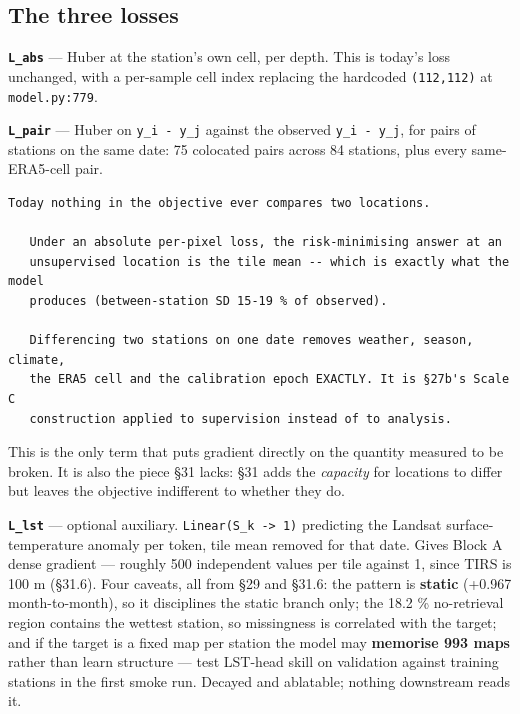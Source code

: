 \documentclass[10pt,a4paper]{article}
\begin{document}
\subsection*{The three losses}

\textbf{\texttt{L\_abs}} — Huber at the station's own cell, per depth. This is today's loss
unchanged, with a per-sample cell index replacing the hardcoded \texttt{(112,112)} at
\texttt{model.py:779}.

\textbf{\texttt{L\_pair}} — Huber on \texttt{y\_i - y\_j} against the observed \texttt{y\_i - y\_j}, for pairs
of stations on the same date: 75 colocated pairs across 84 stations, plus every
same-ERA5-cell pair.

\begin{Verbatim}[fontsize=\scriptsize,frame=leftline,framerule=0.6pt,rulecolor=\color{rulegray},xleftmargin=6pt,framesep=6pt,]
   Today nothing in the objective ever compares two locations.

   Under an absolute per-pixel loss, the risk-minimising answer at an
   unsupervised location is the tile mean -- which is exactly what the model
   produces (between-station SD 15-19 % of observed).

   Differencing two stations on one date removes weather, season, climate,
   the ERA5 cell and the calibration epoch EXACTLY. It is §27b's Scale C
   construction applied to supervision instead of to analysis.
\end{Verbatim}

This is the only term that puts gradient directly on the quantity measured to
be broken. It is also the piece §31 lacks: §31 adds the \emph{capacity} for
locations to differ but leaves the objective indifferent to whether they do.

\textbf{\texttt{L\_lst}} — optional auxiliary. \texttt{Linear(S\_k -> 1)} predicting the Landsat
surface-temperature anomaly per token, tile mean removed for that date. Gives
Block A dense gradient — roughly 500 independent values per tile against 1,
since TIRS is 100 m (§31.6). Four caveats, all from §29 and §31.6: the pattern
is \textbf{static} (+0.967 month-to-month), so it disciplines the static branch only;
the 18.2 \% no-retrieval region contains the wettest station, so missingness is
correlated with the target; and if the target is a fixed map per station the
model may \textbf{memorise 993 maps} rather than learn structure — test LST-head
skill on validation against training stations in the first smoke run. Decayed
and ablatable; nothing downstream reads it.
\end{document}
